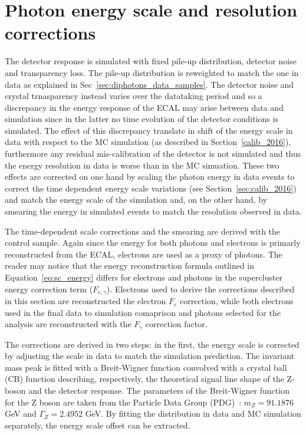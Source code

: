 \clearpage
\section{Photon energy scale and resolution corrections}
\label{sec:dipho_energy}
The detector response is simulated with fixed pile-up distribution, detector noise and transparency loss.
The pile-up distribution is reweighted to match the one in data as explained in Sec~\ref{sec:diphotons_data_samples}.
The detector noise and crystal trnasparency instead varies over the datataking period and so a discrepancy
in the energy response of the ECAL may arise between data and simulation since in the latter no time evolution
of the detector conditions is simulated. The effect of this discrepancy translate in shift of the energy
scale in data with respect to the MC simulation (as described in Section~\ref{calib_2016}),
furthermore any residual mis-calibration of the detector
is not simulated and thus the energy resolution in data is worse than in the MC simuation.
These two effects are corrected on one hand by
scaling the photon energy in data events
to correct the time dependent energy scale variations (see Section~\ref{sec:calib_2016})
and match the energy scale of the simulation and,
on the other hand, by smearing the energy in simulated events to match the resolution observed in data.

The time-dependent scale corrections and the smearing are derived with the \Zee control sample.
Again since the energy for both photons and electrons is primarly reconstructed from the ECAL, electrons
are used as a proxy of photons. The reader may notice that the energy reconstruction formula outlined in
Equation~\ref{eq:sc_energy} differs for electrons and photons in the supercluster energy correction term ($F_{e,\gamma}$).
Electrons used to derive the corrections described in this section are reconstructed the electron $F_e$ correction,
while both electrons used in the final data to simulation comaprison and photons selected for the analysis
are reconstructed with the $F_{\gamma}$ correction factor.

The corrections are derived in two steps: in the first, the energy scale is corrected by
adjusting the scale in data to match the simulation prediction. The \Zee invariant mass peak is fitted with
a Breit-Wigner function convolved with a crystal ball (CB) function describing, respectively,
the theoretical signal line shape of the Z-boson and the detector response.
The parameters of the Breit-Wigner function for the Z boson are taken from the Particle
Data Group (PDG)~\cite{PDG}: $m_Z = 91.1876$ GeV and $\Gamma_Z = 2.4952$ GeV.
By fitting the distribution in data and MC simulation separately, the energy scale offset can be extracted.

